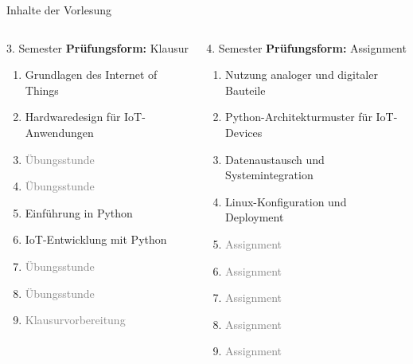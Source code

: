 {
\footnotesize
\begin{frame}{Inhalte der Vorlesung}
        \begin{columns}
            \begin{column}[T]{.5\textwidth}
                \begin{block}{3. Semester}
                    \medskip
                    \textbf{Prüfungsform:} Klausur
                    \medskip

                    \begin{enumerate}
                        \item Grundlagen des Internet of Things
                        \item Hardwaredesign für IoT-Anwendungen
                        \item \textcolor{gray}{Übungsstunde}
                        \item \textcolor{gray}{Übungsstunde}
                        \item Einführung in Python
                        \item IoT-Entwicklung mit Python
                        \item \textcolor{gray}{Übungsstunde}
                        \item \textcolor{gray}{Übungsstunde}
                        \item \textcolor{gray}{Klausurvorbereitung}
                    \end{enumerate}
                \end{block}
            \end{column}
            \begin{column}[T]{.5\textwidth}
                \begin{block}{4. Semester}
                    \medskip
                    \textbf{Prüfungsform:} Assignment
                    \medskip

                    \begin{enumerate}
                        \item Nutzung analoger und digitaler Bauteile
                        \item Python-Architekturmuster für IoT-Devices
                        \item Datenaustausch und Systemintegration
                        \item Linux-Konfiguration und Deployment
                        \item \textcolor{gray}{Assignment}
                        \item \textcolor{gray}{Assignment}
                        \item \textcolor{gray}{Assignment}
                        \item \textcolor{gray}{Assignment}
                        \item \textcolor{gray}{Assignment}
                    \end{enumerate}
                \end{block}
            \end{column}
        \end{columns}
\end{frame}
}

